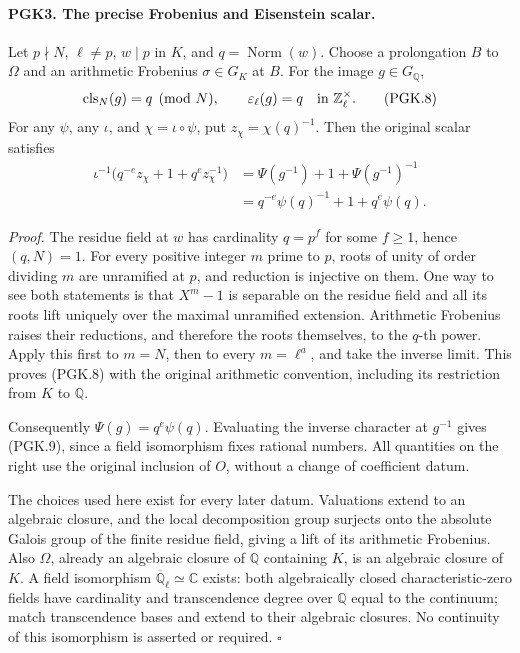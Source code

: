 \paragraph{PGK3. The precise Frobenius and Eisenstein scalar.}
\label{claim:PGK3}
Let \(p\nmid N\), \(\ell\ne p\), \(w\mid p\) in \(K\), and
\(q=\operatorname{Norm}(w)\). Choose a prolongation \(B\) to
\(\Omega\) and an arithmetic Frobenius \(\sigma\in G_K\) at
\(B\). For the image \(g\in G_{\mathbb Q}\),
\[
 \operatorname{cls}_N(g)=q\pmod N,\qquad
           \varepsilon_\ell(g)=q\quad\hbox{in }\mathbb Z_\ell^\times.
 \tag{PGK.8}
\]
For any \(\psi\), any \(\iota\), and
\(\chi=\iota\circ\psi\), put \(z_\chi=\chi(q)^{-1}\).
Then the original scalar satisfies
\[
 \begin{split}
 \iota^{-1}\bigl(q^{-e}z_\chi+1+q^ez_\chi^{-1}\bigr)
 &=\Psi(g^{-1})+1+\Psi(g^{-1})^{-1}\\
 &=q^{-e}\psi(q)^{-1}+1+q^e\psi(q).
 \end{split}                                                     \tag{PGK.9}
\]

\emph{Proof.}
The residue field at \(w\) has cardinality \(q=p^f\) for
some \(f\ge1\), hence \((q,N)=1\). For every positive integer
\(m\) prime to \(p\), roots of unity of order dividing \(m\)
are unramified at \(p\), and reduction is injective on them.
One way to see both statements is that \(X^m-1\) is separable
on the residue field and all its roots lift uniquely over the
maximal unramified extension. Arithmetic Frobenius raises
their reductions, and therefore the roots themselves, to
the \(q\)-th power. Apply this first to \(m=N\), then to
every \(m=\ell^a\), and take the inverse limit. This proves
(PGK.8) with the original arithmetic convention, including
its restriction from \(K\) to \(\mathbb Q\).

Consequently \(\Psi(g)=q^e\psi(q)\). Evaluating the
inverse character at \(g^{-1}\) gives (PGK.9), since a field
isomorphism fixes rational numbers. All quantities on the
right use the original inclusion of \(O\), without a change
of coefficient datum.

The choices used here exist for every later datum. Valuations
extend to an algebraic closure, and the local decomposition
group surjects onto the absolute Galois group of the finite
residue field, giving a lift of its arithmetic Frobenius.
Also \(\Omega\), already an algebraic closure of \(\mathbb Q\)
containing \(K\), is an algebraic closure of \(K\). A field
isomorphism \(\overline{\mathbb Q}_\ell\simeq\mathbb C\)
exists: both algebraically closed characteristic-zero fields
have cardinality and transcendence degree over \(\mathbb Q\)
equal to the continuum; match transcendence bases and extend
to their algebraic closures. No continuity of this isomorphism
is asserted or required. \hfill\(\square\)

